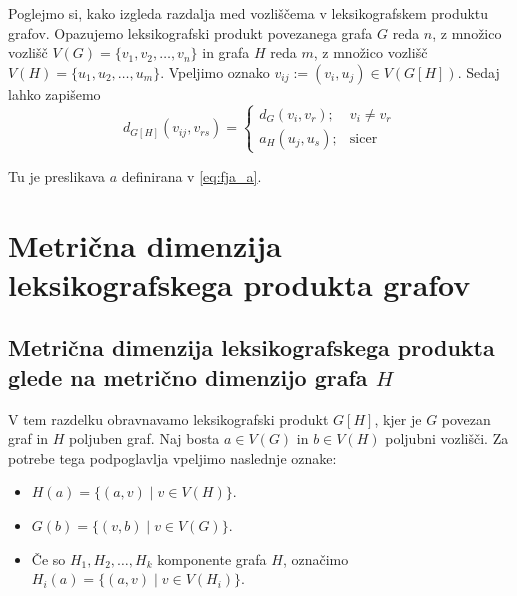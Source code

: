 \documentclass[mat1, tisk]{fmfdelo}
\newcommand{\1}{(1, 1, \ldots, 1)}
\newcommand{\2}{(2, 2, \ldots, 2)}
\begin{document}
Poglejmo si, kako izgleda razdalja med vozliščema v leksikografskem produktu grafov. 
Opazujemo leksikografski produkt povezanega grafa $G$ reda $n$, z množico vozlišč
$V(G) = \{v_1, v_2, \ldots , v_n \}$ in grafa $H$ reda $m$, z množico vozlišč 
$V(H) = \{u_1, u_2, \ldots , u_m \}$. Vpeljimo oznako 
$v_{ij} := (v_i, u_j) \in V(G[H]).$
Sedaj lahko zapišemo
\begin{equation} \label{eq:razdalja_produkta}
    d_{G[H]}(v_{ij}, v_{rs}) = 
    \begin{cases}
        d_G(v_i, v_r); & v_i \neq v_r \\
        a_H(u_j, u_s); & \text{sicer}
    \end{cases}
\end{equation} 

Tu je preslikava $a$ definirana v \eqref{eq:fja_a}.




\section{Metrična dimenzija leksikografskega produkta grafov}\label{s:mdim_prod}



\subsection{Metrična dimenzija leksikografskega produkta glede na metrično 
dimenzijo grafa $H$} \label{ss:mdim_komp_prod}

V tem razdelku obravnavamo leksikografski produkt $G[H]$, kjer je $G$ povezan graf in $H$ 
poljuben graf. Naj bosta $a \in V(G)$ in $b \in V(H)$ poljubni vozlišči. Za potrebe tega 
podpoglavlja vpeljimo naslednje oznake:
\begin{itemize}
    \item $H(a) = \{ (a, v) \; | \; v \in V(H) \}$.
    \item $G(b) = \{ (v, b) \; | \; v \in V(G) \}$.
    \item Če so $H_1, H_2, \ldots , H_k$ komponente grafa $H$, označimo 
    $H_i(a) = \{ (a, v) \; | \; v \in V(H_i) \}$.
\end{itemize}
\end{document}
